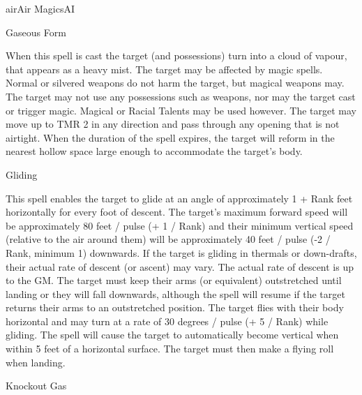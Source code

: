 \begin{College}[2.1]{air}{Air Magics}{AI}
\begin{spell}[S-7]{Gaseous Form}

\begin{effects}
When this spell is cast the target (and possessions) turn into a cloud
of vapour, that appears as a heavy mist.  The target may be affected
by magic spells.  Normal or silvered weapons do not harm the target,
but magical weapons may. The target may not use any possessions such
as weapons, nor may the target cast or trigger magic.  Magical or
Racial Talents may be used however.  The target may move up to TMR 2
in any direction and pass through any opening that is not airtight.
When the duration of the spell expires, the target will reform in the
nearest hollow space large enough to accommodate the target’s body.
\end{effects}
\end{spell}

\begin{spell}[S-8]{Gliding}

\begin{effects}
This spell enables the target to glide at an angle of approximately 1
+ Rank feet horizontally for every foot of descent.  The target’s
maximum forward speed will be approximately 80 feet / pulse (+ 1 /
Rank) and their minimum vertical speed (relative to the air around
them) will be approximately 40 feet / pulse (-2 / Rank, minimum 1)
downwards.  If the target is gliding in thermals or down-drafts, their
actual rate of descent (or ascent) may vary.  The actual rate of
descent is up to the GM.  The target must keep their arms (or
equivalent) outstretched until landing or they will fall downwards,
although the spell will resume if the target returns their arms to an
outstretched position.  The target flies with their body horizontal
and may turn at a rate of 30 degrees / pulse (+ 5 / Rank) while
gliding.  The spell will cause the target to automatically become
vertical when within 5 feet of a horizontal surface. The target must
then make a flying roll when landing.
\end{effects}
\end{spell}

\begin{spell}[S-9]{Knockout Gas}


\end{spell}
\end{College}
